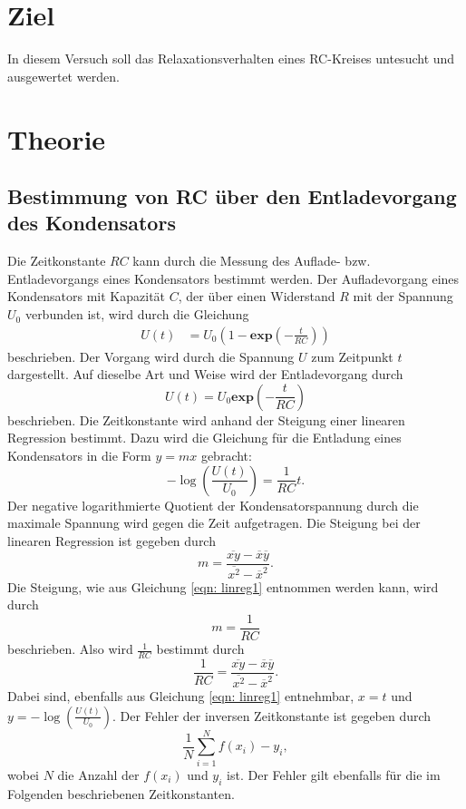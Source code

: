 
\section{Ziel}
In diesem Versuch soll das Relaxationsverhalten eines RC-Kreises untesucht und ausgewertet werden. 

\section{Theorie}
\cite{versuch}
\label{sec:Theorie}
\subsection{Bestimmung von RC über den Entladevorgang des Kondensators}
Die Zeitkonstante $RC$ kann durch die Messung des Auflade- bzw. Entladevorgangs eines Kondensators bestimmt werden.
Der Aufladevorgang eines Kondensators mit Kapazität $C$, der über einen Widerstand $R$ mit der Spannung $U_{0}$ verbunden ist, wird durch die Gleichung
\begin{align*}
     U(t)&= U_{0} (1-\mathbf{exp}(-\frac{t}{RC}))
\end{align*}
beschrieben. Der Vorgang wird durch die Spannung $U$ zum Zeitpunkt $t$ dargestellt. 
Auf dieselbe Art und Weise wird der Entladevorgang durch
\begin{equation*}
     U(t) = U_{0} \mathbf{exp}(-\frac{t}{RC})
\end{equation*}
beschrieben.
Die Zeitkonstante wird anhand der Steigung einer linearen Regression bestimmt.
Dazu wird die Gleichung für die Entladung eines Kondensators in die Form $y=mx$ gebracht:
\begin{equation}
    - \log(\frac{U(t)}{U_{0}}) = \frac{1}{RC} t.
    \label{eqn: linreg1}
\end{equation}
Der negative logarithmierte Quotient der Kondensatorspannung durch die maximale Spannung wird gegen die Zeit aufgetragen.
Die Steigung bei der linearen Regression ist gegeben durch
\begin{equation*}
    m = \frac{\overline{xy} - \overline{x}\overline{y}}{\overline{x^2} - \overline{x}^2}.
\end{equation*}
Die Steigung, wie aus Gleichung \eqref{eqn: linreg1} entnommen werden kann, wird durch
\begin{equation*}
    m = \frac{1}{RC}
\end{equation*}
beschrieben. Also wird $\frac{1}{RC}$ bestimmt durch
\begin{equation}
    \frac{1}{RC}= \frac{\overline{xy} - \overline{x}\overline{y}}{\overline{x^2} - \overline{x}^2}.
    \label{eqn: RC}
\end{equation}
Dabei sind, ebenfalls aus Gleichung \eqref{eqn: linreg1} entnehmbar, $x=t$ und $y=-\log(\frac{U(t)}{U_{0}})$. %
Der Fehler der inversen Zeitkonstante ist gegeben durch
\begin{equation}
    \frac{1}{N} \sum_{i=1}^N f(x_{i}) - y_{i},
    \label{eqn: fehler}
\end{equation}
wobei $N$ die Anzahl der %
$f(x_{i})$ %
und $y_{i}$ %
ist. Der Fehler gilt ebenfalls für die im Folgenden beschriebenen Zeitkonstanten.

